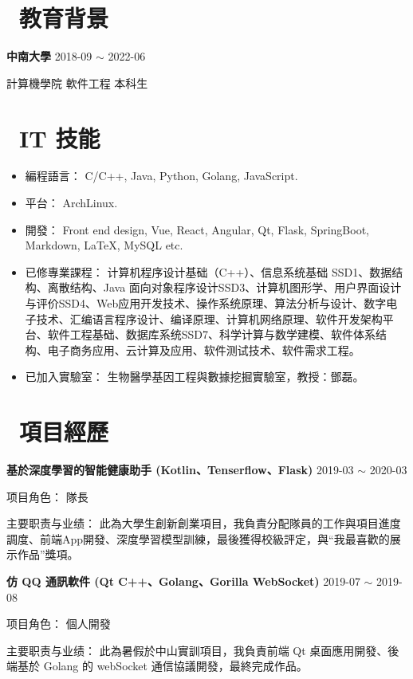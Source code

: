 \documentclass[12pt, a4paper]{article}
\begin{document}
\section{\color{CVBlue}\faGraduationCap\  教育背景}

\textbf{中南大學} \hfill 2018-09 $\sim$ 2022-06

計算機學院 \quad 軟件工程 \quad 本科生

\section{\color{CVBlue}\faCogs\ IT 技能}
\begin{itemize}[parsep=0.5ex]
  \item 編程語言： C/C++, Java, Python, Golang, JavaScript.
  \item 平台： ArchLinux.
  \item 開發： Front end design, Vue, React, Angular, Qt, Flask, SpringBoot, Markdown, LaTeX, MySQL etc.
  \item 已修專業課程： 计算机程序设计基础（C++）、信息系统基础 SSD1、数据结构、离散结构、Java 面向对象程序设计SSD3、计算机图形学、用户界面设计与评价SSD4、Web应用开发技术、操作系统原理、算法分析与设计、数字电子技术、汇编语言程序设计、编译原理、计算机网络原理、软件开发架构平台、软件工程基础、数据库系统SSD7、科学计算与数学建模、软件体系结构、电子商务应用、云计算及应用、软件测试技术、软件需求工程。
  \item 已加入實驗室： 生物醫學基因工程與數據挖掘實驗室，教授：鄧磊。
\end{itemize}

\section{\color{CVBlue}\faUsers\ 項目經歷}

\textbf{基於深度學習的智能健康助手 (Kotlin、Tenserflow、Flask)} \hfill 2019-03 $\sim$ 2020-03

项目角色： \quad 隊長

主要职责与业绩： \quad 此為大學生創新創業項目，我負責分配隊員的工作與項目進度調度、前端App開發、深度學習模型訓練，最後獲得校級評定，與``我最喜歡的展示作品''獎項。

\textbf{仿 QQ 通訊軟件 (Qt C++、Golang、Gorilla WebSocket)} \hfill 2019-07 $\sim$ 2019-08

项目角色： \quad 個人開發

主要职责与业绩： \quad 此為暑假於中山實訓項目，我負責前端 Qt 桌面應用開發、後端基於 Golang 的 webSocket 通信協議開發，最終完成作品。
\end{document}
